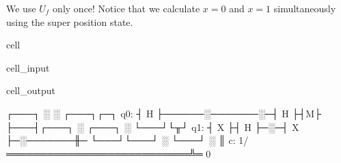 \documentclass[letterpaper,10pt,english]{jupyterBook}
\begin{document}
\sphinxAtStartPar
We use \(U_f\) only once!   Notice that we calculate \(x=0\) and \(x=1\) simultaneously using the super position state.

\begin{sphinxuseclass}{cell}\begin{sphinxVerbatimInput}

\begin{sphinxuseclass}{cell_input}
\begin{sphinxVerbatim}[commandchars=\\\{\}]

\PYG{p}{[}\PYG{p}{]}
\PYG{p}{[}\PYG{p}{[}\PYG{p}{]}\PYG{p}{[}\PYG{p}{]}\PYG{p}{]}
\PYG{p}{[}\PYG{p}{]}
\PYG{p}{[}\PYG{p}{]}\PYG{p}{[}\PYG{p}{]}

\end{sphinxVerbatim}

\end{sphinxuseclass}\end{sphinxVerbatimInput}
\begin{sphinxVerbatimOutput}

\begin{sphinxuseclass}{cell_output}
\begin{sphinxVerbatim}[commandchars=\\\{\}]
     ┌───┐      ░       ░ ┌───┐┌─┐
q\PYGZus{}0: ┤ H ├──────░───────░─┤ H ├┤M├
     ├───┤┌───┐ ░ ┌───┐ ░ └───┘└╥┘
q\PYGZus{}1: ┤ X ├┤ H ├─░─┤ X ├─░───────╫─
     └───┘└───┘ ░ └───┘ ░       ║
c: 1/═══════════════════════════╩═
                                0
\end{sphinxVerbatim}

\end{sphinxuseclass}\end{sphinxVerbatimOutput}

\end{sphinxuseclass}
\end{document}
